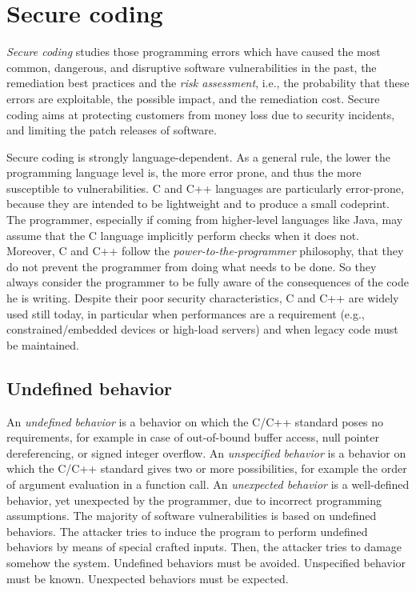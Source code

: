 \documentclass[a4paper,12pt]{article}
\begin{document}
\newpage

\section{Secure coding}
\textit{Secure coding} studies those programming errors which have caused the most common, dangerous, and disruptive software vulnerabilities in the past, the remediation best practices and the \textit{risk assessment}, i.e., the probability that these errors are exploitable, the possible impact, and the remediation cost. Secure coding aims at protecting customers from money loss due to security incidents, and limiting the patch releases of software.

Secure coding is strongly language-dependent. As a general rule, the lower the programming language level is, the more error prone, and thus the more susceptible to vulnerabilities. C and C++ languages are particularly error-prone, because they are intended to be lightweight and to produce a small codeprint. The programmer, especially if coming from higher-level languages like Java, may assume that the C language implicitly perform checks when it does not. Moreover, C and C++ follow the \textit{power-to-the-programmer} philosophy, that they do not prevent the programmer from doing what needs to be done. So they always consider the programmer to be fully aware of the consequences of the code he is writing. Despite their poor security characteristics, C and C++ are widely used still today, in particular when performances are a requirement (e.g., constrained/embedded devices or high-load servers) and when legacy code must be maintained.

\subsection{Undefined behavior}
An \textit{undefined behavior} is a behavior on which the C/C++ standard poses no requirements, for example in case of out-of-bound buffer access, null pointer dereferencing, or signed integer overflow. An \textit{unspecified behavior} is a behavior on which the C/C++ standard gives two or more possibilities, for example the order of argument evaluation in a function call. An \textit{unexpected behavior} is a well-defined behavior, yet unexpected by the programmer, due to incorrect programming assumptions. The majority of software vulnerabilities is based on undefined behaviors. The attacker tries to induce the program to perform undefined behaviors by means of special crafted inputs. Then, the attacker tries to damage somehow the system. Undefined behaviors must be avoided. Unspecified behavior must be known. Unexpected behaviors must be expected.
\end{document}
